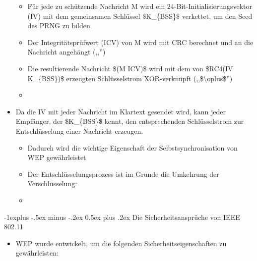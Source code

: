 \documentclass[a4paper]{article}
\makeatletter
\renewcommand{\subsection}{\@startsection{subsection}{2}{0mm}%
 {-1explus -.5ex minus -.2ex}%
 {0.5ex plus .2ex}%
 {\normalfont\normalsize\bfseries}}
\makeatother
\begin{document}
\begin{multicols}{3}
\begin{itemize}
              \begin{itemize}
                  \item
                        Für jede zu schützende Nachricht M wird ein
                        24-Bit-Initialisierungsvektor (IV) mit dem gemeinsamen Schlüssel
                        \$K\_\{BSS\}\$ verkettet, um den Seed des PRNG zu bilden.
                  \item
                        Der Integritätsprüfwert (ICV) von M wird mit CRC berechnet und an
                        die Nachricht angehängt (,,\textbar\textbar'')
                  \item
                        Die resultierende Nachricht \$(M \textbar\textbar{} ICV)\$ wird mit
                        dem von \$RC4(IV \textbar\textbar{} K\_\{BSS\})\$ erzeugten
                        Schlüsselstrom XOR-verknüpft (,,\$\textbackslash oplus\$'')
                  \item
              \end{itemize}
        \item
              Da die IV mit jeder Nachricht im Klartext gesendet wird, kann jeder
              Empfänger, der \$K\_\{BSS\}\$ kennt, den entsprechenden Schlüsselstrom
              zur Entschlüsselung einer Nachricht erzeugen.

              \begin{itemize}
                  \item
                        Dadurch wird die wichtige Eigenschaft der Selbstsynchronisation von
                        WEP gewährleistet
                  \item
                        Der Entschlüsselungsprozess ist im Grunde die Umkehrung der
                        Verschlüsselung:
                  \item
              \end{itemize}
    \end{itemize}


    \subsection{Die Sicherheitsansprüche von IEEE
        802.11}

    \begin{itemize}
        \item
              WEP wurde entwickelt, um die folgenden Sicherheitseigenschaften zu
              gewährleisten:


\end{itemize}
\end{multicols}
\end{document}
